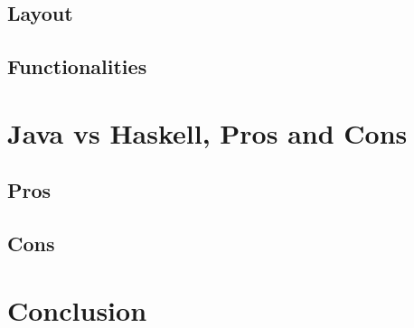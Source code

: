 \documentclass[a4paper,11pt,twoside]{report}
\begin{document}
\section{Layout}

\section{Functionalities}

\chapter{Java vs Haskell, Pros and Cons}

\section{Pros}

\section{Cons}

\chapter{Conclusion}




\end{document}
